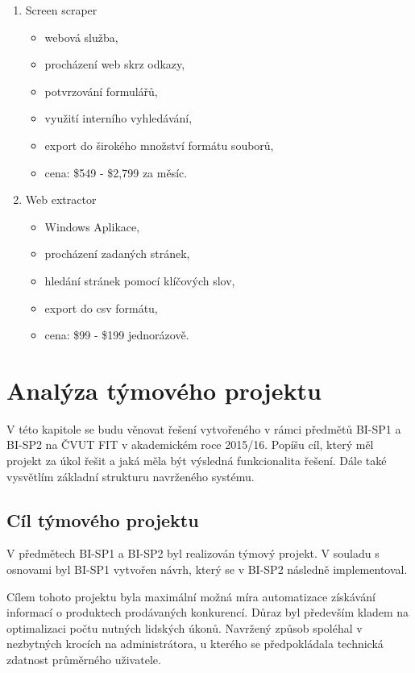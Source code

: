 \documentclass[thesis=B,czech]{FITthesis}[2012/06/26]
\begin{document}
\begin{enumerate}
\item Screen scraper~\cite{ScreenScraper}

  \begin{itemize}
    \item webová služba,
    \item procházení web skrz odkazy,
    \item potvrzování formulářů,
    \item využití interního vyhledávání,
    \item export do širokého množství formátu souborů,
    \item cena: \$549 - \$2,799 za měsíc.
  \end{itemize}
  
\item Web extractor~\cite{WebExtractor}

  \begin{itemize}
    \item Windows Aplikace,
    \item procházení zadaných stránek,
    \item hledání stránek pomocí klíčových slov,
    \item export do csv formátu,
    \item cena: \$99 - \$199 jednorázově.
  \end{itemize}


\end{enumerate}

\newpage

\chapter{Analýza týmového projektu}
V této kapitole se budu věnovat řešení vytvořeného v rámci předmětů BI-SP1 a BI-SP2 na ČVUT FIT v akademickém roce 2015/16.
Popíšu cíl, který měl projekt za úkol řešit a jaká měla být výsledná funkcionalita řešení. Dále také vysvětlím základní strukturu
navrženého systému.

\section{Cíl týmového projektu}

V předmětech BI-SP1 a BI-SP2 byl realizován týmový projekt. V souladu s osnovami byl BI-SP1 vytvořen návrh, který
se v BI-SP2 následně implementoval.
\par
Cílem tohoto projektu byla maximální možná míra automatizace získávání informací o produktech prodávaných konkurencí. Důraz byl především kladem na optimalizaci počtu nutných lidských úkonů. Navržený způsob spoléhal v nezbytných krocích na administrátora, u kterého se předpokládala technická zdatnost průměrného uživatele.
\par
\end{document}
